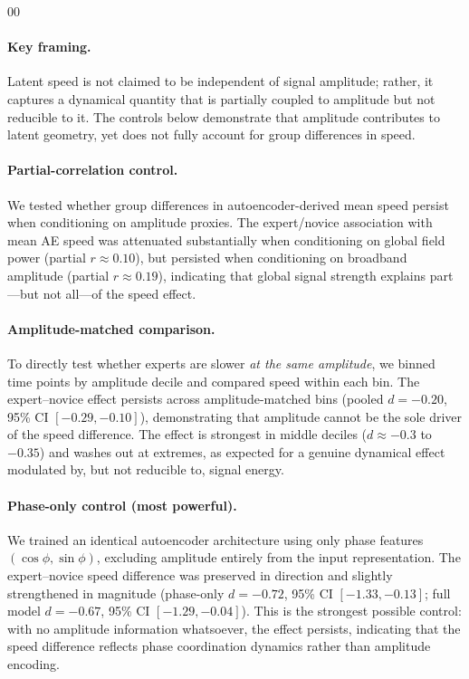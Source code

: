 \documentclass[5p,twocolumn,authoryear]{elsarticle}
\begin{document}
\begin{thebibliography}{00}
\paragraph{Key framing.}
Latent speed is not claimed to be independent of signal amplitude; rather, it captures a dynamical quantity that is partially coupled to amplitude but not reducible to it. The controls below demonstrate that amplitude contributes to latent geometry, yet does not fully account for group differences in speed.

\paragraph{Partial-correlation control.}
We tested whether group differences in autoencoder-derived mean speed persist when conditioning on amplitude proxies. The expert/novice association with mean AE speed was attenuated substantially when conditioning on global field power (partial $r\approx 0.10$), but persisted when conditioning on broadband amplitude (partial $r\approx 0.19$), indicating that global signal strength explains part---but not all---of the speed effect.

\paragraph{Amplitude-matched comparison.}
To directly test whether experts are slower \emph{at the same amplitude}, we binned time points by amplitude decile and compared speed within each bin. The expert--novice effect persists across amplitude-matched bins (pooled $d = -0.20$, 95\% CI $[-0.29, -0.10]$), demonstrating that amplitude cannot be the sole driver of the speed difference. The effect is strongest in middle deciles ($d \approx -0.3$ to $-0.35$) and washes out at extremes, as expected for a genuine dynamical effect modulated by, but not reducible to, signal energy.

\paragraph{Phase-only control (most powerful).}
We trained an identical autoencoder architecture using only phase features $(\cos\phi, \sin\phi)$, excluding amplitude entirely from the input representation. The expert--novice speed difference was preserved in direction and slightly strengthened in magnitude (phase-only $d = -0.72$, 95\% CI $[-1.33, -0.13]$; full model $d = -0.67$, 95\% CI $[-1.29, -0.04]$). This is the strongest possible control: with no amplitude information whatsoever, the effect persists, indicating that the speed difference reflects phase coordination dynamics rather than amplitude encoding.


\end{thebibliography}
\end{document}
